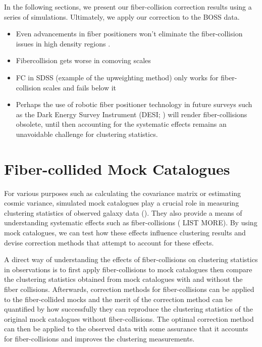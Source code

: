 \documentclass{emulateapj}
\begin{document}
In the following sections, we present our fiber-collision correction results using a series of simulations. Ultimately, we apply our correction to the BOSS data. 
\begin{itemize}
\item Even advancements in fiber positioners won't eliminate the fiber-collision issues in high density regions \cite{Morales:2012aa}. 
\item Fibercollision gets worse in comoving scales 
\item \cite{Zehavi:2002aa} FC in SDSS (example of the upweighting method) only works for fiber-collision scales and fails below it
\item Perhaps the use of robotic fiber positioner technology in future surveys such as the Dark Energy Survey Instrument (DESI; \citealt{Schlegel:2011aa, Makarem:2014aa}) will render fiber-collisions obsolete, until then accounting for the systematic effects remains an unavoidable challenge for clustering statistics. 
\end{itemize}

\section{Fiber-collided Mock Catalogues} \label{sec:catalog}
For various purposes such as calculating the covariance matrix or estimating cosmic variance, simulated mock catalogues play a crucial role in measuring clustering statistics of observed galaxy data (\citealt{Scoccimarro:2002aa, Anderson:2012aa, Manera:2013aa}). They also provide a means of understanding systematic effects such as fiber-collisions (\citealt{Yoon:2008aa, Guo:2012aa} LIST MORE). By using mock catalogues, we can test how these effects influence clustering results and devise correction methods that attempt to account for these effects.

A direct way of understanding the effects of fiber-collisions on clustering statistics in observations is to first apply fiber-collisions to mock catalogues then compare the clustering statistics obtained from mock catalogues with and without the fiber collisions. Afterwards, correction methods for fiber-collisions can be applied to the fiber-collided mocks and the merit of the correction method can be quantified by how successfully they can reproduce the clustering statistics of the original mock catalogues without fiber-collisions. The optimal correction method can then be applied to the observed data with some assurance that it accounts for fiber-collisions and improves the clustering measurements. 
\end{document}
